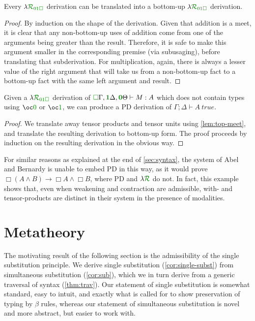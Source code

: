 \documentclass[submission,copyright,creativecommons]{eptcs}
\begin{document}
\begin{lemma}
  Every $\name_{\instPD}$ derivation can be translated into a bottom-up
  $\name_{\instPD}$ derivation.
\end{lemma}
\begin{proof}
  By induction on the shape of the derivation.
  Given that addition is a meet, it is clear that any non-bottom-up uses of
  addition come from one of the arguments being greater than the result.
  Therefore, it is safe to make this argument smaller in the corresponding
  premise (via subusaging), before translating that subderivation.
  For multiplication, again, there is always a lesser value of the right
  argument that will take us from a non-bottom-up fact to a bottom-up fact with
  the same left argument and result.
\end{proof}

\begin{proposition}[\name{} $\to$ PD]
  Given a $\name_{\instPD}$ derivation of
  $\ctx{\Gamma}{\vct\valid}, \ctx{\Delta}{\vct\true}, \ctx{\Theta}{\vct\unused}
  \vdash M : A$ which does not contain types using $\excl{\unused}{}$ or
  $\excl{\true}{}$, we can produce a PD derivation of
  $\Gamma; \Delta \vdash A~\mathit{true}$.
\end{proposition}
\begin{proof}
  We translate away tensor products and tensor units using
  \autoref{lem:top-meet}, and translate the resulting derivation to bottom-up
  form.
  The proof proceeds by induction on the resulting derivation in the obvious
  way.
\end{proof}

For similar reasons as explained at the end of \autoref{sec:syntax}, the
system of Abel and Bernardy \cite{AbelBernardy2020} is unable to embed PD in
this way, as it would prove
$\Box(A \wedge B) \to \Box A \wedge \Box B$, where PD and $\name$ do not.
In fact, this example shows that, even when weakening and contraction are
admissible, with- and tensor-products are distinct in their system in the
presence of modalities.

\section{Metatheory}\label{sec:metatheory}

The motivating result of the following section is the admissibility of the
single substitution principle.
We derive single substitution (\autoref{cor:single-subst}) from simultaneous
substitution (\autoref{cor:sub}), which we in turn derive from a generic
traversal of syntax (\autoref{thm:trav}).
Our statement of single substitution is somewhat standard, easy to intuit, and
exactly what is called for to show preservation of typing by $\beta$ rules,
whereas our statement of simultaneous substitution is novel and more abstract,
but easier to work with.
\end{document}

